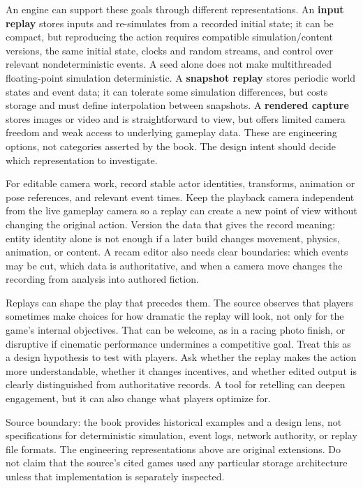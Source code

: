 An engine can support these goals through different representations. An \textbf{input replay} stores inputs and re-simulates from a recorded initial state; it can be compact, but reproducing the action requires compatible simulation/content versions, the same initial state, clocks and random streams, and control over relevant nondeterministic events. A seed alone does not make multithreaded floating-point simulation deterministic. A \textbf{snapshot replay} stores periodic world states and event data; it can tolerate some simulation differences, but costs storage and must define interpolation between snapshots. A \textbf{rendered capture} stores images or video and is straightforward to view, but offers limited camera freedom and weak access to underlying gameplay data. These are engineering options, not categories asserted by the book. The design intent should decide which representation to investigate.

For editable camera work, record stable actor identities, transforms, animation or pose references, and relevant event times. Keep the playback camera independent from the live gameplay camera so a replay can create a new point of view without changing the original action. Version the data that gives the record meaning: entity identity alone is not enough if a later build changes movement, physics, animation, or content. A recam editor also needs clear boundaries: which events may be cut, which data is authoritative, and when a camera move changes the recording from analysis into authored fiction.

Replays can shape the play that precedes them. The source observes that players sometimes make choices for how dramatic the replay will look, not only for the game's internal objectives. That can be welcome, as in a racing photo finish, or disruptive if cinematic performance undermines a competitive goal. Treat this as a design hypothesis to test with players. Ask whether the replay makes the action more understandable, whether it changes incentives, and whether edited output is clearly distinguished from authoritative records. A tool for retelling can deepen engagement, but it can also change what players optimize for.

Source boundary: the book provides historical examples and a design lens, not specifications for deterministic simulation, event logs, network authority, or replay file formats. The engineering representations above are original extensions. Do not claim that the source's cited games used any particular storage architecture unless that implementation is separately inspected.

